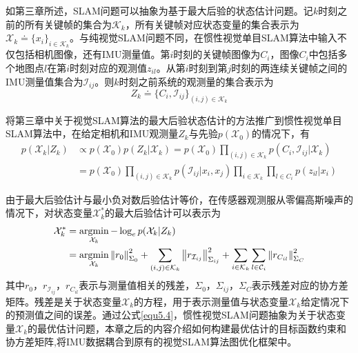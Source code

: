 如第三章所述，SLAM问题可以抽象为基于最大后验的状态估计问题。记$k$时刻之前的所有关键帧的集合为$\mathcal{K}_k$，所有关键帧对应状态变量的集合表示为$\mathcal{X}_k \doteq \{x_i\}_{i \in \mathcal{K}_k}$。与纯视觉SLAM问题不同，在惯性视觉单目SLAM算法中输入不仅包括相机图像，还有IMU测量值。第$i$时刻的关键帧图像为$C_i$，图像$C_i$中包括多个地图点$l$在第$i$时刻对应的观测值$z_{il}$。从第$i$时刻到第$j$时刻的两连续关键帧之间的IMU测量值集合为$\mathcal{I}_{ij}$。则$k$时刻之前系统的观测量的集合表示为
\begin{equation}
\label{equ5.2}
Z_k \doteq \{C_i,\mathcal{I}_{ij}\}_{(i,j) \in \mathcal{K}_k}
\end{equation}

将第三章中关于视觉SLAM算法的最大后验状态估计的方法推广到惯性视觉单目SLAM算法中，在给定相机和IMU观测量$Z_k$与先验$p(\mathcal{X}_0)$的情况下，有
\begin{equation}
\label{equ5.3}
\begin{aligned}
p(\mathcal{X}_k | Z_k) & \varpropto p(\mathcal{X}_0)p(Z_k | \mathcal{X}_k) = p(\mathcal{X}_0) \prod\limits_{(i,j) \in \mathcal{K}_k} p \left( C_i,\mathcal{I}_{ij} | \mathcal{X}_k \right) \\
&=p(\mathcal{X}_0) \prod\limits_{(i,j) \in \mathcal{K}_k} p \left( \mathcal{I}_{ij} | x_i,x_j \right) \prod\limits_{i \in \mathcal{K}_k} \prod\limits_{l \in C_i}  p \left( z_{il} | x_i \right)
\end{aligned}
\end{equation}

由于最大后验估计与最小负对数后验估计等价，在传感器观测服从零偏高斯噪声的情况下，对状态变量$\mathcal{X}_k^*$的最大后验估计可以表示为
\begin{equation}
\label{equ5.4}
\begin{aligned}
\mathcal{X}_k^* & = \operatorname*{argmin}\limits_{\mathcal{X}_k}- \log_e p(\mathcal{X}_k | Z_k) \\ 
& = \operatorname*{argmin}\limits_{\mathcal{X}_k} \left\Vert r_0 \right\Vert_{\Sigma_0}^2+ \sum\limits_{(i,j) \in \mathcal{K}_k}\left\Vert r_{\mathcal{I}_{ij}} \right\Vert_{\Sigma_{ij}}^2+ \sum\limits_{i \in \mathcal{K}_k}\sum\limits_{l \in \mathcal{C}_i} \left\Vert r_{C_{il}} \right\Vert_{\Sigma_{C}}^2
\end{aligned}
\end{equation}
其中$r_0$，$ r_{\mathcal{I}_{ij}}$，$r_{C_{il}}$表示与测量值相关的残差，$\Sigma_0$，$ \Sigma_{ij}$，$\Sigma_C$表示残差对应的协方差矩阵。残差是关于状态变量$\mathcal{X}_k$的方程，用于表示测量值与状态变量$\mathcal{X}_k$给定情况下的预测值之间的误差。通过公式\ref{equ5.4}，惯性视觉SLAM问题抽象为关于状态变量$\mathcal{X}_k$的最优估计问题，本章之后的内容介绍如何构建最优估计的目标函数约束和协方差矩阵,将IMU数据耦合到原有的视觉SLAM算法图优化框架中。


